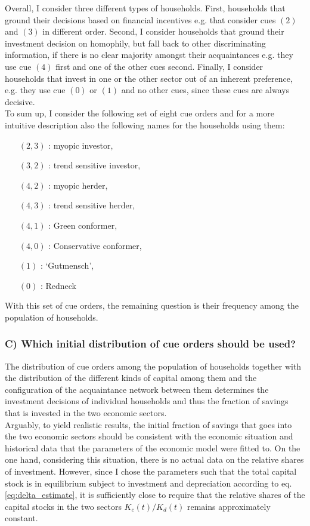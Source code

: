 Overall, I consider three different types of households. First, households that ground their decisions based on financial incentives e.g. that consider cues $(2)$ and $(3)$ in different order. Second, I consider households that ground their investment decision on homophily, but fall back to other discriminating information, if there is no clear majority amongst their acquaintances e.g. they use cue $(4)$ first and one of the other cues second. Finally, I consider households that invest in one or the other sector out of an inherent preference, e.g. they use cue $(0)$ or $(1)$ and no other cues, since these cues are always decisive. \\

To sum up, I consider the following set of eight cue orders and for a more intuitive description also the following names for the households using them:
\begin{itemize}
  \item [$(2, 3)$]: myopic investor,
	\item [$(3, 2)$]: trend sensitive investor,
	\item [$(4, 2)$]: myopic herder,
	\item [$(4, 3)$]: trend sensitive herder,
	\item [$(4, 1)$]: Green conformer,
	\item [$(4, 0)$]: Conservative conformer,
	\item [$(1)$]: `Gutmensch',
	\item [$(0)$]: Redneck
\end{itemize}
With this set of cue orders, the remaining question is their frequency among the population of households.

\subsubsection*{C) Which initial distribution of cue orders should be used?}

The distribution of cue orders among the population of households together with the distribution of the different kinds of capital among them and the configuration of the acquaintance network between them determines the investment decisions of individual households and thus the fraction of savings that is invested in the two economic sectors. \\
Arguably, to yield realistic results, the initial fraction of savings that goes into the two economic sectors should be consistent with the economic situation and historical data that the parameters of the economic model were fitted to. On the one hand, considering this situation, there is no actual data on the relative shares of investment. However, since I chose the parameters such that the total capital stock is in equilibrium subject to investment and depreciation according to eq. \ref{eq:delta_estimate}, it is sufficiently close to require that the relative shares of the capital stocks in the two sectors $K_c(t)/K_d(t)$ remains approximately constant.\\

